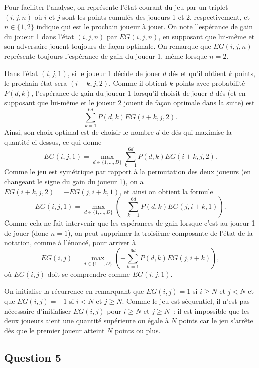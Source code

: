 \documentclass[a4paper,11pt]{amsart}
\theoremstyle{plain}
\begin{document}
Pour faciliter l'analyse, on représente l'état courant du jeu par un triplet $(i, j, n)$ où $i$ et $j$ sont les points cumulés des joueurs 1 et 2, respectivement, et $n \in \{1, 2\}$ indique qui est le prochain joueur à jouer. On note l'espérance de gain du joueur 1 dans l'état $(i, j, n)$ par $EG(i, j, n)$, en supposant que lui-même et son adversaire jouent toujours de façon optimale. On remarque que $EG(i, j, n)$ représente toujours l'espérance de gain du joueur 1, même lorsque $n = 2$.

Dans l'état $(i, j, 1)$, si le joueur 1 décide de jouer $d$ dés et qu'il obtient $k$ points, le prochain état sera $(i+k, j, 2)$. Comme il obtient $k$ points avec probabilité $P(d, k)$, l'espérance de gain du joueur 1 lorsqu'il choisit de jouer $d$ dés (et en supposant que lui-même et le joueur 2 jouent de façon optimale dans la suite) est
\begin{equation}
\label{EsperanceGainDFixe}
\sum_{k=1}^{6d} P(d, k) EG(i+k, j, 2).
\end{equation}
Ainsi, son choix optimal est de choisir le nombre $d$ de dés qui maximise la quantité ci-dessus, ce qui donne
\[
EG(i, j, 1) = \max_{d \in \{1, \dotsc, D\}} \sum_{k=1}^{6d} P(d, k) EG(i+k, j, 2).
\]
Comme le jeu est symétrique par rapport à la permutation des deux joueurs (en changeant le signe du gain du joueur 1), on a $EG(i+k, j, 2) = -EG(j, i+k, 1)$, et ainsi on obtient la formule
\[
EG(i, j, 1) = \max_{d \in \{1, \dotsc, D\}} \left(-\sum_{k=1}^{6d} P(d, k) EG(j, i+k, 1)\right).
\]
Comme cela ne fait intervenir que les espérances de gain lorsque c'est au joueur 1 de jouer (donc $n = 1$), on peut supprimer la troisième composante de l'état de la notation, comme à l'énoncé, pour arriver à
\begin{equation}
\label{EsperanceGainRec}
EG(i, j) = \max_{d \in \{1, \dotsc, D\}} \left(-\sum_{k=1}^{6d} P(d, k) EG(j, i+k)\right),
\end{equation}
où $EG(i, j)$ doit se comprendre comme $EG(i, j, 1)$.

On initialise la récurrence en remarquant que $EG(i, j) = 1$ si $i \geq N$ et $j < N$ et que $EG(i, j) = -1$ si $i < N$ et $j \geq N$. Comme le jeu est séquentiel, il n'est pas nécessaire d'initialiser $EG(i, j)$ pour $i \geq N$ et $j \geq N$~: il est impossible que les deux joueurs aient une quantité supérieure ou égale à $N$ points car le jeu s'arrête dès que le premier joueur atteint $N$ points ou plus.

\subsection{Question 5}
\end{document}
